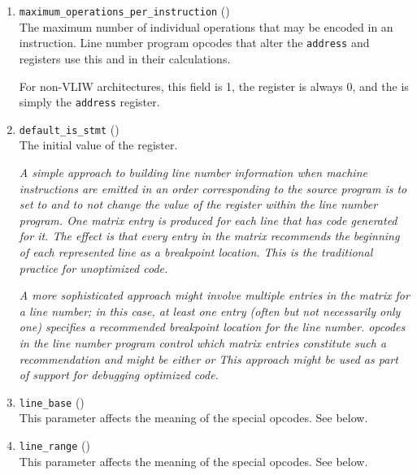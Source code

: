 \begin{enumerate}[1. ]
\item \texttt{maximum\_operations\_per\_instruction} (\HFTubyte) \\
The 
maximum number of individual operations that may be
encoded in an instruction. Line number program opcodes
that alter the \texttt{address} and 
 registers use this and
 in their calculations.

For non-VLIW
architectures, this field is 1, the  register is always
0, and the  is simply the \texttt{address} register.

\item \texttt{default\_is\_stmt} (\HFTubyte) \\
The initial value of the  register.  

\textit{A simple approach
to building line number information when machine instructions
are emitted in an order corresponding to the source program
is to set 
to  and to not change the
value of the  register 
within the line number program.
One matrix entry is produced for each line that has code
generated for it. The effect is that every entry in the
matrix recommends the beginning of each represented line as
a breakpoint location. This is the traditional practice for
unoptimized code.}

\textit{A more sophisticated approach might involve multiple entries in
the matrix for a line number; in this case, at least one entry
(often but not necessarily only one) specifies a recommended
breakpoint location for the line number. \DWLNSnegatestmt{}
opcodes in the line number program control which matrix entries
constitute such a recommendation and 
 might
be either  or  This approach might be
used as part of support for debugging optimized code.}

\item \texttt{line\_base} (\HFTsbyte) \\
This parameter affects the meaning of the special opcodes. See below.

\item \texttt{line\_range} (\HFTubyte) \\
This parameter affects the meaning of the special opcodes. See below.


\end{enumerate}
